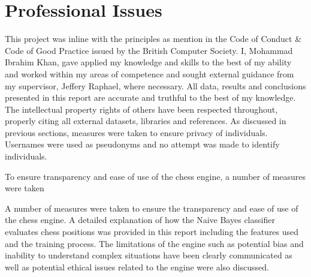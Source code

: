 \section{Professional Issues}

This project was inline with the principles as mention in the Code of Conduct \& Code of Good Practice issued by the British Computer Society. I, Mohammad Ibrahim Khan, gave applied my knowledge and skills to the best of my ability and worked within my areas of competence and sought external guidance from my supervisor, Jeffery Raphael, where necessary. All data, results and conclusions presented in this report are accurate and truthful to the best of my knowledge. The intellectual property rights of others have been respected throughout, properly citing all external datasets, libraries and references. As discussed in previous sections, measures were taken to ensure privacy of individuals. Usernames were used as pseudonyms and no attempt was made to identify individuals.  

To ensure transparency and ease of use of the chess engine, a number of measures were taken

A number of measures were taken to ensure the transparency and ease of use of the chess engine. A detailed explanation of how the Naive Bayes classifier evaluates chess positions was provided in this report including the features used and the training process. The limitations of the engine such as potential bias and inability to understand complex situations have been clearly communicated as well as potential ethical issues related to the engine were also discussed. 